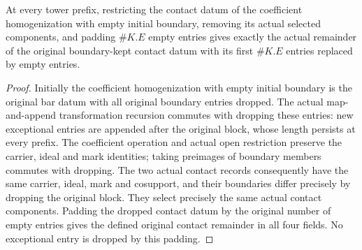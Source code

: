 \begin{theorem}
\label{hir:zero-contact-remainder-literal-history-dictionary}
\leanok
{}
At every tower prefix, restricting the contact datum of the coefficient
homogenization with empty initial boundary, removing its actual selected
components, and padding $\#K.E$ empty entries gives exactly the actual
remainder of the original boundary-kept contact datum with its first
$\#K.E$ entries replaced by empty entries.
\end{theorem}
\begin{proof}
Initially the coefficient homogenization with empty initial boundary
is the original bar datum with all original boundary entries dropped.
The actual map-and-append transformation recursion commutes with dropping
these entries: new exceptional entries are appended after the original
block, whose length persists at every prefix. The coefficient operation
and actual open restriction preserve the carrier, ideal and mark
identities; taking preimages of boundary members commutes with dropping.
The two actual contact records consequently have the same carrier,
ideal, mark and cosupport, and their boundaries differ precisely by
dropping the original block. They select precisely the same actual
contact components. Padding the dropped contact datum by the original
number of empty entries gives the defined original contact remainder
in all four fields. No exceptional entry is dropped by this padding.
\end{proof}

